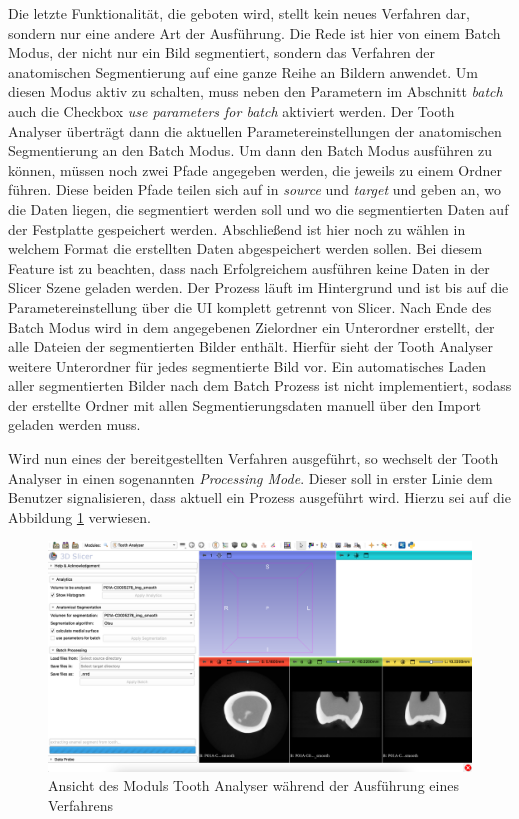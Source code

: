 Die letzte Funktionalität, die geboten wird, stellt kein neues Verfahren dar, sondern
nur eine andere Art der Ausführung. Die Rede ist hier von einem Batch Modus, der
nicht nur ein Bild segmentiert, sondern das Verfahren der anatomischen
Segmentierung auf eine ganze Reihe an Bildern anwendet. Um diesen Modus aktiv zu
schalten, muss neben den Parametern im Abschnitt \textit{batch} auch die Checkbox
\textit{use parameters for batch} aktiviert werden. Der Tooth Analyser überträgt
dann die aktuellen Parametereinstellungen der anatomischen Segmentierung an den Batch
Modus. Um dann den Batch Modus ausführen zu können, müssen noch zwei Pfade angegeben
werden, die jeweils zu einem Ordner führen. Diese beiden Pfade teilen sich auf in
\textit{source} und \textit{target} und geben an, wo die Daten liegen, die segmentiert
werden soll und wo die segmentierten Daten auf der Festplatte gespeichert werden.
Abschließend ist hier noch zu wählen in welchem Format die erstellten Daten
abgespeichert werden sollen. Bei diesem Feature ist zu beachten, dass nach
Erfolgreichem ausführen keine Daten in der Slicer Szene geladen werden. Der Prozess
läuft im Hintergrund und ist bis auf die Parametereinstellung über die UI komplett
getrennt von Slicer. Nach Ende des Batch Modus wird in dem angegebenen
Zielordner ein Unterordner erstellt, der alle Dateien der segmentierten Bilder enthält.
Hierfür sieht der Tooth Analyser weitere Unterordner für jedes segmentierte Bild
vor. Ein automatisches Laden aller segmentierten Bilder nach dem Batch Prozess ist
nicht implementiert, sodass der erstellte Ordner mit allen Segmentierungsdaten
manuell über den Import geladen werden muss.

Wird nun eines der bereitgestellten Verfahren ausgeführt, so wechselt der Tooth Analyser
in einen sogenannten \textit{Processing Mode}. Dieser soll in erster Linie dem Benutzer
signalisieren, dass aktuell ein Prozess ausgeführt wird. Hierzu sei auf die Abbildung
\ref{fig:processing_mode} verwiesen.

\begin{figure}[h]
	\centering
	\includegraphics[scale=1, width=\textwidth]{img/processingMode.png}
	\caption{Ansicht des Moduls Tooth Analyser während der Ausführung eines
	Verfahrens}
	\label{fig:processing_mode}
\end{figure}

